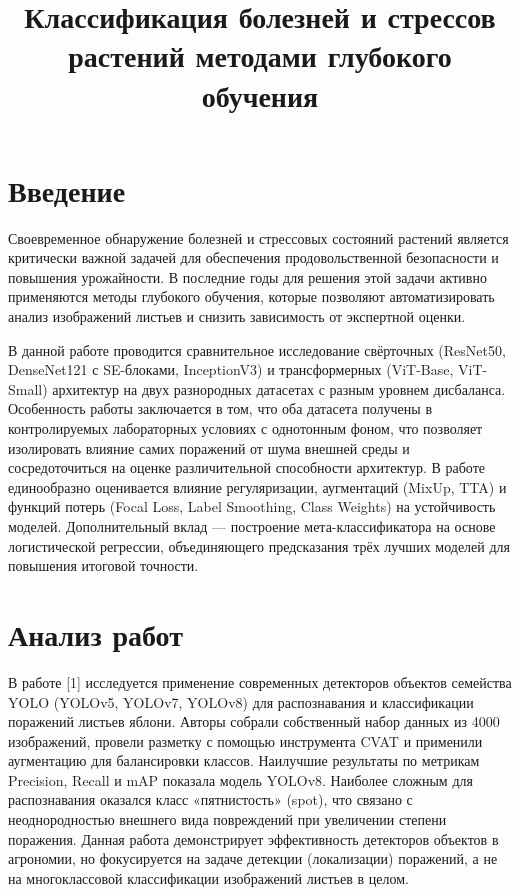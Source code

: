 \documentclass{misisarticle}
\title{Классификация болезней и стрессов растений методами глубокого обучения}
\begin{document}
\maketitle

\section{Введение}
Своевременное обнаружение болезней и стрессовых состояний растений является критически важной задачей для обеспечения продовольственной безопасности и повышения урожайности. В последние годы для решения этой задачи активно применяются методы глубокого обучения, которые позволяют автоматизировать анализ изображений листьев и снизить зависимость от экспертной оценки.

В данной работе проводится сравнительное исследование свёрточных (ResNet50, DenseNet121 с SE-блоками, InceptionV3) и трансформерных (ViT-Base, ViT-Small) архитектур на двух разнородных датасетах с разным уровнем дисбаланса. Особенность работы заключается в том, что оба датасета получены в контролируемых лабораторных условиях с однотонным фоном, что позволяет изолировать влияние самих поражений от шума внешней среды и сосредоточиться на оценке различительной способности архитектур. В работе единообразно оценивается влияние регуляризации, аугментаций (MixUp, TTA) и функций потерь (Focal Loss, Label Smoothing, Class Weights) на устойчивость моделей. Дополнительный вклад — построение мета-классификатора на основе логистической регрессии, объединяющего предсказания трёх лучших моделей для повышения итоговой точности.

\section{Анализ работ}
В работе [1] исследуется применение современных детекторов объектов семейства YOLO (YOLOv5, YOLOv7, YOLOv8) для распознавания и классификации поражений листьев яблони. Авторы собрали собственный набор данных из 4000 изображений, провели разметку с помощью инструмента CVAT и применили аугментацию для балансировки классов. Наилучшие результаты по метрикам Precision, Recall и mAP показала модель YOLOv8. Наиболее сложным для распознавания оказался класс «пятнистость» (spot), что связано с неоднородностью внешнего вида повреждений при увеличении степени поражения. Данная работа демонстрирует эффективность детекторов объектов в агрономии, но фокусируется на задаче детекции (локализации) поражений, а не на многоклассовой классификации изображений листьев в целом.
\end{document}
